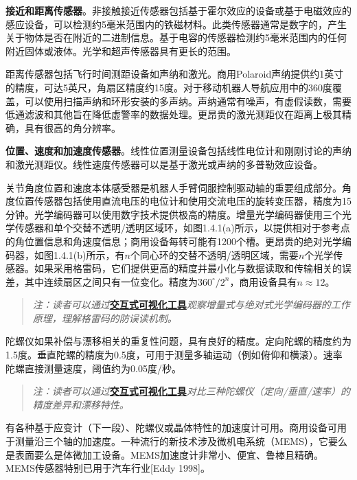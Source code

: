 \documentclass[UTF8,a4paper]{ctexart}
\begin{document}
\textbf{接近和距离传感器}。非接触接近传感器包括基于霍尔效应的设备或基于电磁效应的感应设备，可以检测约5毫米范围内的铁磁材料。此类传感器通常是数字的，产生关于物体是否在附近的二进制信息。基于电容的传感器检测约5毫米范围内的任何附近固体或液体。光学和超声传感器具有更长的范围。

距离传感器包括飞行时间测距设备如声纳和激光。商用Polaroid声纳提供约1英寸的精度，可达5英尺，角扇区精度约15度。对于移动机器人导航应用中的360度覆盖，可以使用扫描声纳和环形安装的多声纳。声纳通常有噪声，有虚假读数，需要低通滤波和其他旨在降低虚警率的数据处理。更昂贵的激光测距仪在距离上极其精确，具有很高的角分辨率。

\textbf{位置、速度和加速度传感器}。线性位置测量设备包括线性电位计和刚刚讨论的声纳和激光测距仪。线性速度传感器可以是基于激光或声纳的多普勒效应设备。

关节角度位置和速度本体感受器是机器人手臂伺服控制驱动轴的重要组成部分。角度位置传感器包括使用直流电压的电位计和使用交流电压的旋转变压器，精度为15分钟。光学编码器可以使用数字技术提供极高的精度。增量光学编码器使用三个光学传感器和单个交替不透明/透明区域环，如图1.4.1(a)所示，以提供相对于参考点的角位置信息和角速度信息；商用设备每转可能有1200个槽。更昂贵的绝对光学编码器，如图1.4.1(b)所示，有$n$个同心环的交替不透明/透明区域，需要$n$个光学传感器。如果采用格雷码，它们提供更高的精度并最小化与数据读取和传输相关的误差，其中连续扇区之间只有一位变化。精度为$360^\circ/2^n$，商用设备具有$n\approx 12$。

\begin{quote}
\textit{注：读者可以通过}\href{https://frankjie09.github.io/Robot-Manipulator-Control-CN/figures/Optical_Encoder_Demo.html}{\textbf{交互式可视化工具}}\textit{观察增量式与绝对式光学编码器的工作原理，理解格雷码的防误读机制。}
\end{quote}

陀螺仪如果补偿与漂移相关的重复性问题，具有良好的精度。定向陀螺的精度约为1.5度。垂直陀螺的精度为0.5度，可用于测量多轴运动（例如俯仰和横滚）。速率陀螺直接测量速度，阈值约为0.05度/秒。

\begin{quote}
\textit{注：读者可以通过}\href{https://frankjie09.github.io/Robot-Manipulator-Control-CN/figures/Gyroscope_Demo.html}{\textbf{交互式可视化工具}}\textit{对比三种陀螺仪（定向/垂直/速率）的精度差异和漂移特性。}
\end{quote}

有各种基于应变计（下一段）、陀螺仪或晶体特性的加速度计可用。商用设备可用于测量沿三个轴的加速度。一种流行的新技术涉及微机电系统（MEMS），它要么是表面要么是体微加工设备。MEMS加速度计非常小、便宜、鲁棒且精确。MEMS传感器特别已用于汽车行业[Eddy 1998]。
\end{document}
